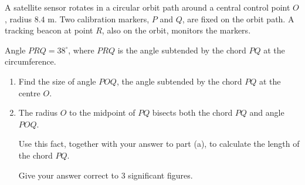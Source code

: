\documentclass[11pt]{article}
\begin{document}
\begin{question}
\noindent A satellite sensor rotates in a circular orbit path around a central control point $O$, radius $8.4$ m. Two calibration markers, $P$ and $Q$, are fixed on the orbit path. A tracking beacon at point $R$, also on the orbit, monitors the markers.

\noindent Angle $PRQ = 38^\circ$, where $PRQ$ is the angle subtended by the chord $PQ$ at the circumference.

\begin{center}
\end{center}

\begin{enumerate}
    \item[(a)] Find the size of angle $POQ$, the angle subtended by the chord $PQ$ at the centre $O$.
    \vspace{2.5cm}

    \item[(b)] The radius $O$ to the midpoint of $PQ$ bisects both the chord $PQ$ and angle $POQ$.

    Use this fact, together with your answer to part (a), to calculate the length of the chord $PQ$.

    Give your answer correct to 3 significant figures.
    \vspace{5cm}
\end{enumerate}
\end{question}
\end{document}
